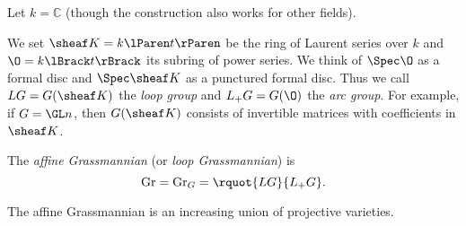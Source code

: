 \documentclass[english, no-theorem-numbers]{short-notes}
\begin{document}
Let $k = ℂ$ (though the construction also works for other fields).

We set $\K = k\lParen t \rParen$ be the ring of Laurent series over $k$ and $\O = k\lBrack t \rBrack$ its subring of power series.
We think of $\Spec \O$ as a formal disc and $\Spec \K$ as a punctured formal disc.
Thus we call $LG = G(\K)$ the \emph{loop group} and $L_+G = G(\O)$ the \emph{arc group}.
For example, if $G = \GL n$, then $G(\K)$ consists of invertible matrices with coefficients in $\K$.

\begin{Def}
    The \emph{affine Grassmannian} (or \emph{loop Grassmannian}) is
    \[
        \Gr = \Gr_G = \rquot{LG}{L_+G}.
    \]
\end{Def}

The affine Grassmannian is an increasing union of projective varieties.
\end{document}
